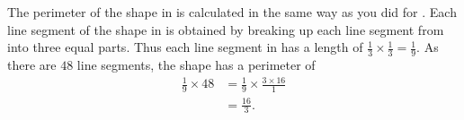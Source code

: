 \documentclass[a4paper,oneside,12pt]{article}
\begin{document}
\begin{problem}
{\begin{solution}
The perimeter of the shape in
 is calculated in the same
way as you did for .
Each line segment of the shape in
 is obtained by breaking
up each line segment from 
into three equal parts.  Thus each line segment in
 has a length of
$\frac{1}{3} \times \frac{1}{3} = \frac{1}{9}$.  As there are $48$
line segments, the shape has a perimeter of
\begin{align*}
\frac{1}{9} \times 48
&=
\frac{1}{9} \times \frac{3 \times 16}{1} \\[4pt]
&=
\frac{16}{3}.
\end{align*}


\end{solution}}
\end{problem}
\end{document}
